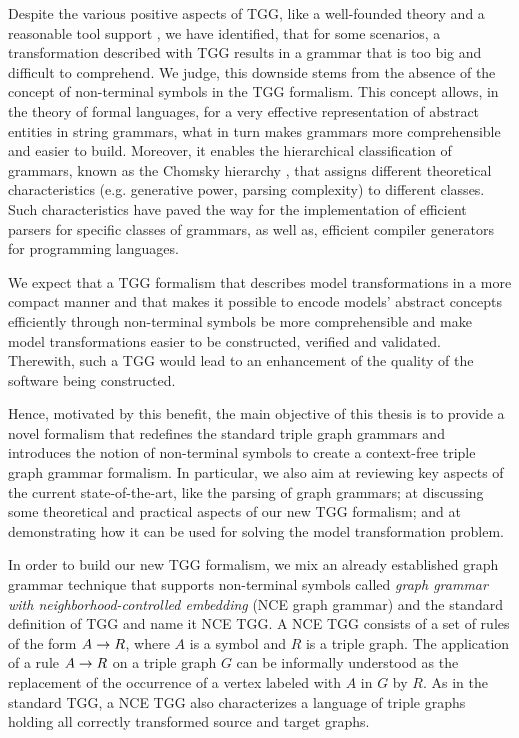 Despite the various positive aspects of TGG, like a well-founded theory and a reasonable tool support \cite{anjorin201620}, we have identified, that for some scenarios, a transformation described with TGG results in a grammar that is too big and difficult to comprehend. We judge, this downside stems from the absence of the concept of non-terminal symbols in the TGG formalism. This concept allows, in the theory of formal languages, for a very effective representation of abstract entities in string grammars, what in turn makes grammars more comprehensible and easier to build. Moreover, it enables the hierarchical classification of grammars, known as the Chomsky hierarchy \cite{chomsky1959}, that assigns different theoretical characteristics (e.g. generative power, parsing complexity) to different classes. Such characteristics have paved the way for the implementation of efficient parsers for specific classes of grammars, as well as, efficient compiler generators for programming languages.

We expect that a TGG formalism that describes model transformations in a more compact manner and that makes it possible to encode models' abstract concepts efficiently through non-terminal symbols be more comprehensible and make model transformations easier to be constructed, verified and validated. Therewith, such a TGG would lead to an enhancement of the quality of the software being constructed.

Hence, motivated by this benefit, the main objective of this thesis is to provide a novel formalism that redefines the standard triple graph grammars and introduces the notion of non-terminal symbols to create a context-free triple graph grammar formalism. In particular, we also aim at reviewing key aspects of the current state-of-the-art, like the parsing of graph grammars; at discussing some theoretical and practical aspects of our new TGG formalism; and at demonstrating how it can be used for solving the model transformation problem.

In order to build our new TGG formalism, we mix an already established graph grammar technique that supports non-terminal symbols called \emph{graph grammar with neighborhood-controlled embedding} (NCE graph grammar) \cite{janssens1982graph} and the standard definition of TGG \cite{schurr1994specification} and name it NCE TGG. A NCE TGG consists of a set of rules of the form $A \to R$, where $A$ is a symbol and $R$ is a triple graph. The application of a rule $A \to R$ on a triple graph $G$ can be informally understood as the replacement of the occurrence of a vertex labeled with $A$ in $G$ by $R$. As in the standard TGG, a NCE TGG also characterizes a language of triple graphs holding all correctly transformed source and target graphs.

